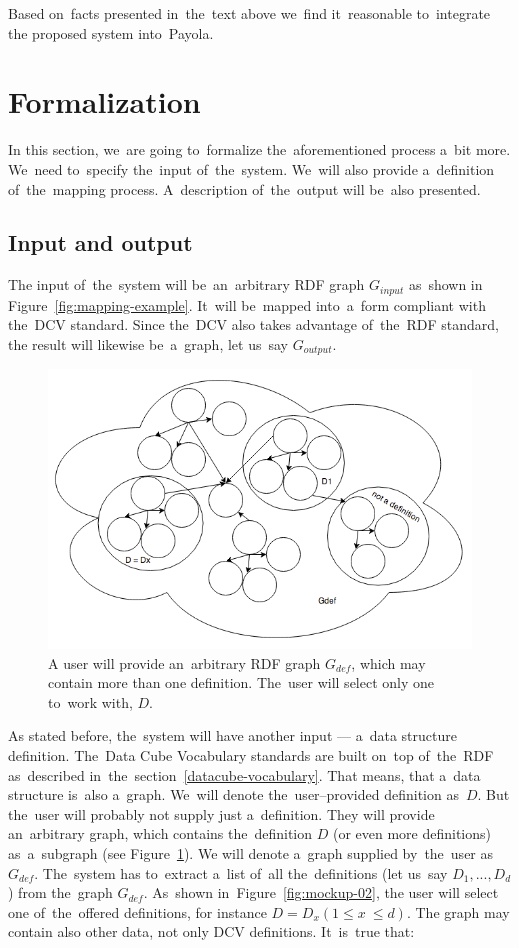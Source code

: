 Based on~facts presented in~the~text above we~find it~reasonable to~integrate 
the proposed system into~Payola.

\section{Formalization}

In this section, we~are going to~formalize the~aforementioned process a~bit 
more. We~need to~specify the~input of~the~system. We~will also 
provide a~definition of~the~mapping process. A~description of~the~output will be~also presented.

\subsection{Input and output}

The input of~the~system will be~an~arbitrary RDF graph $G_{input}$ as~shown
in Figure~\ref{fig:mapping-example}. It~will be~mapped into~a~form compliant
with the~DCV standard. Since the~DCV also takes advantage of~the~RDF standard,
the result will likewise be~a~graph, let us~say $G_{output}$.

\begin{figure}
	\centering
	\includegraphics[width=120mm]{img/definition-in-graph.png}
	\caption{A user will provide an~arbitrary RDF graph $G_{def}$, which may contain more than one definition. The~user will select only one to~work with, $D$.}
	\label{fig:definition-in-graph}
\end{figure}

As stated before, the~system will have another input --- a~data structure 
definition. The~Data Cube Vocabulary standards are built on~top of~the~RDF as~described in~the~section~\ref{datacube-vocabulary}. That means, that a~data structure is~also a~graph. We~will denote the~user--provided definition as~$D$. But the~user will probably not 
supply just a~definition. They will provide an~arbitrary graph, which contains the~definition $D$ 
(or even more definitions) as~a~subgraph (see Figure~\ref{fig:definition-in-graph}).
We will denote a~graph
supplied by~the~user as~$G_{def}$. The~system has to~extract a~list of~all the~definitions
(let us~say $D_1, ..., D_d$) from the~graph $G_{def}$. As~shown in~Figure~\ref{fig:mockup-02},
the user will select one of~the~offered definitions, for instance $D = D_x (1 \leq x~\leq d)$.
The graph may contain also other data, not only DCV definitions. It~is~true 
that:\\

